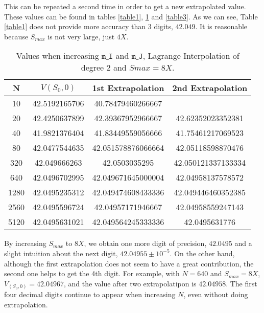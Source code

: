 This can be repeated a second time in order to get a new extrapolated value. These values can be found in tables \ref{table1}, \ref{table2} and \ref{table3}. As we can see, Table \ref{table1} does not provide more accuracy than 3 digits, $42.049$. It is reasonable because $S_{max}$ is not very large, just $4X$.

\begin{table}[h!]\scriptsize
	\setlength{\tabcolsep}{15pt}
	\renewcommand{\arraystretch}{1.2}
	\begin{tabular}{cccc}
		N&  $V(S_0,0)$		& 1st Extrapolation & 2nd Extrapolation\\\hline
		10 &42.5192165706 &40.78479460266667 & \\
		20 &42.4250637899 &42.39367952966667 &42.62352023352381\\
		40 &41.9821376404 &41.83449559056666 &41.75461217069523 \\
		80 &42.0477544635 &42.051578876066664 &42.05118598870476\\
		320 &42.049666263 &42.0503035295 &42.050121337133334\\
		640 &42.0496702995 &42.049671645000004 &42.04958137578572 \\
		1280 &42.0495235312 &42.049474608433336 &42.049446460352385\\ 
		2560 &42.0495596724 &42.04957171946667 &42.04958559247143\\
		5120 &42.0495631021 &42.049564245333336 &42.0495631776
	\end{tabular}
	\vspace{0.2cm}
	\captionsetup{width=.55\linewidth}
	\caption{Values when increasing $\texttt{m_I}$ and $\texttt{m_J}$, Lagrange Interpolation of degree $2$ and $Smax = 8X$.}\label{table2}
\end{table}
By increasing $S_{max}$ to $8X$, we obtain one more digit of precision, $42.0495$ and a slight intuition about the next digit, $42.04955\pm10^{-5}$. On the other hand, although the first extrapolation does not seem to have a great contribution, the second one helps to get the 4th digit. For example, with $N=640$ and $S_{max} = 8X$, $V_(S_0,0) = 42.04967$, and the value after two extrapolatipon is $42.04958$. The first four decimal digits continue to appear when increasing $N$, even without doing extrapolation.
